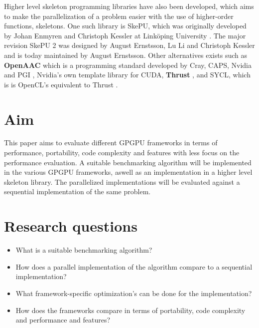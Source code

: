 Higher level skeleton programming libraries have also been developed, which aims to make the parallelization of a problem easier with the use of higher-order functions, skeletons. One such library is SkePU, which was originally developed by Johan Enmyren and Christoph Kessler at Linköping University \cite{enmyren2010skepu}. The major revision SkePU 2 was designed by August Ernstsson, Lu Li and Christoph Kessler and is today maintained by August Ernstsson. Other alternatives exists such as \textbf{OpenAAC} which is a programming standard developed by Cray, CAPS, Nvidia and PGI \cite{OpenACC}, Nvidia's own template library for CUDA, \textbf{Thrust} \cite{Thrust}, and SYCL, which is is OpenCL's equivalent to Thrust \cite{SYCL}.


\section{Aim} %

This paper aims to evaluate different GPGPU frameworks in terms of performance, portability, code complexity and features with less focus on the performance evaluation. A suitable benchmarking algorithm will be implemented in the various GPGPU frameworks, aswell as an implementation in a higher level skeleton library. The parallelized implementations will be evaluated against a sequential implementation of the same problem.


\section{Research questions}  %

\begin{itemize}
    \item What is a suitable benchmarking algorithm?
    \item How does a parallel implementation of the algorithm compare to a sequential implementation?
    \item What framework-specific optimization's can be done for the implementation?
    \item How does the frameworks compare in terms of portability, code complexity and performance and features?
\end{itemize}


